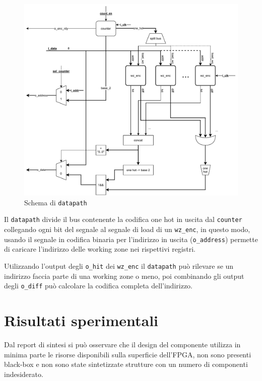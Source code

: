 \documentclass[a4paper]{article}
\begin{document}
\begin{figure}[H]
  \centering
  \includegraphics[width=\linewidth]{schema-datapath.pdf}
  \caption{Schema di \texttt{datapath}}
  \label{fig:datapath}
\end{figure}

Il \texttt{datapath} divide il bus contenente la codifica one hot in uscita dal \texttt{counter} collegando ogni bit del segnale al segnale di load di un \texttt{wz\_enc}, in questo modo, usando il segnale in codifica binaria per l'indirizzo in uscita (\texttt{o\_address}) permette di caricare l'indirizzo delle working zone nei rispettivi registri. 

Utilizzando l'output degli \texttt{o\_hit} dei \texttt{wz\_enc} il \texttt{datapath} può rilevare se un indirizzo faccia parte di una working zone o meno, poi combinando gli output degli \texttt{o\_diff} può calcolare la codifica completa dell'indirizzo.


\section{Risultati sperimentali}

Dal report di sintesi si può osservare che il design del componente utilizza in minima parte le risorse disponibili sulla superficie dell'FPGA, non sono presenti black-box e non sono state sintetizzate strutture con un numero di componenti indesiderato.
\end{document}
